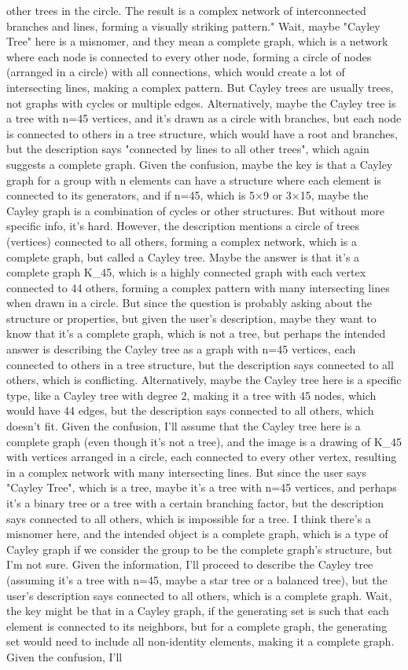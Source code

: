 other trees in the circle. The result is a complex network of interconnected branches and lines, forming a visually striking pattern." Wait, maybe "Cayley Tree" here is a misnomer, and they mean a complete graph, which is a network where each node is connected to every other node, forming a circle of nodes (arranged in a circle) with all connections, which would create a lot of intersecting lines, making a complex pattern. But Cayley trees are usually trees, not graphs with cycles or multiple edges. Alternatively, maybe the Cayley tree is a tree with n=45 vertices, and it's drawn as a circle with branches, but each node is connected to others in a tree structure, which would have a root and branches, but the description says "connected by lines to all other trees", which again suggests a complete graph. Given the confusion, maybe the key is that a Cayley graph for a group with n elements can have a structure where each element is connected to its generators, and if n=45, which is 5×9 or 3×15, maybe the Cayley graph is a combination of cycles or other structures. But without more specific info, it's hard. However, the description mentions a circle of trees (vertices) connected to all others, forming a complex network, which is a complete graph, but called a Cayley tree. Maybe the answer is that it's a complete graph K_45, which is a highly connected graph with each vertex connected to 44 others, forming a complex pattern with many intersecting lines when drawn in a circle. But since the question is probably asking about the structure or properties, but given the user's description, maybe they want to know that it's a complete graph, which is not a tree, but perhaps the intended answer is describing the Cayley tree as a graph with n=45 vertices, each connected to others in a tree structure, but the description says connected to all others, which is conflicting. Alternatively, maybe the Cayley tree here is a specific type, like a Cayley tree with degree 2, making it a tree with 45 nodes, which would have 44 edges, but the description says connected to all others, which doesn't fit. Given the confusion, I'll assume that the Cayley tree here is a complete graph (even though it's not a tree), and the image is a drawing of K_45 with vertices arranged in a circle, each connected to every other vertex, resulting in a complex network with many intersecting lines. But since the user says "Cayley Tree", which is a tree, maybe it's a tree with n=45 vertices, and perhaps it's a binary tree or a tree with a certain branching factor, but the description says connected to all others, which is impossible for a tree. I think there's a misnomer here, and the intended object is a complete graph, which is a type of Cayley graph if we consider the group to be the complete graph's structure, but I'm not sure. Given the information, I'll proceed to describe the Cayley tree (assuming it's a tree with n=45, maybe a star tree or a balanced tree), but the user's description says connected to all others, which is a complete graph. Wait, the key might be that in a Cayley graph, if the generating set is such that each element is connected to its neighbors, but for a complete graph, the generating set would need to include all non-identity elements, making it a complete graph. Given the confusion, I'll 